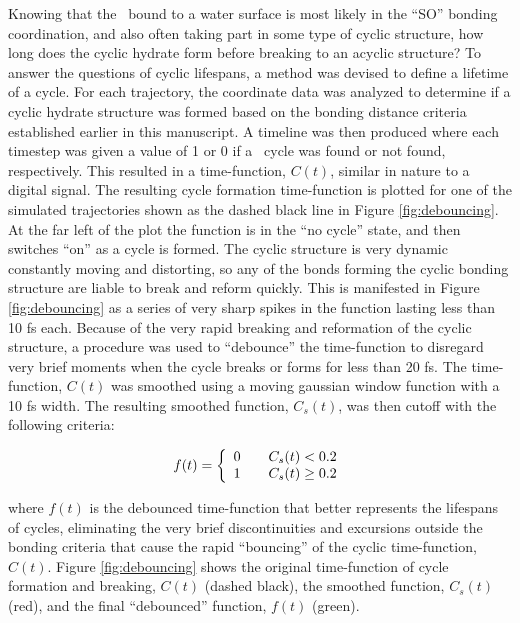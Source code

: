 Knowing that the \suldiox~bound to a water surface is most likely in the ``SO'' bonding coordination, and also often taking part in some type of cyclic structure, how long does the cyclic hydrate form before breaking to an acyclic structure? To answer the questions of cyclic lifespans, a method was devised to define a lifetime of a cycle. For each trajectory, the coordinate data was analyzed to determine if a cyclic hydrate structure was formed based on the bonding distance criteria established earlier in this manuscript. A timeline was then produced where each timestep was given a value of 1 or 0 if a \suldiox~cycle was found or not found, respectively. This resulted in a time-function, $C(t)$, similar in nature to a digital signal. The resulting cycle formation time-function is plotted for one of the simulated trajectories shown as the dashed black line in Figure \ref{fig:debouncing}. At the far left of the plot the function is in the ``no cycle'' state, and then switches ``on'' as a cycle is formed. The cyclic structure is very dynamic constantly moving and distorting, so any of the bonds forming the cyclic bonding structure are liable to break and reform quickly. This is manifested in Figure \ref{fig:debouncing} as a series of very sharp spikes in the function lasting less than 10 fs each. Because of the very rapid breaking and reformation of the cyclic structure, a procedure was used to ``debounce'' the time-function to disregard very brief moments when the cycle breaks or forms for less than 20 fs. The time-function, $C(t)$ was smoothed using a moving gaussian window function with a 10 fs width. The resulting smoothed function, $C_s(t)$, was then cutoff with the following criteria:

\[
  f(t) = \left\{ 
  \begin{array}{l l}
    0 & \quad C_s(t) < 0.2\\
    1 & \quad C_s(t) \geq 0.2\\
  \end{array} \right.
\]

where $f(t)$ is the debounced time-function that better represents the lifespans of cycles, eliminating the very brief discontinuities and excursions outside the bonding criteria that cause the rapid ``bouncing'' of the cyclic time-function, $C(t)$. Figure \ref{fig:debouncing} shows the original time-function of cycle formation and breaking, $C(t)$ (dashed black), the smoothed function, $C_s(t)$ (red), and the final ``debounced'' function, $f(t)$ (green).


